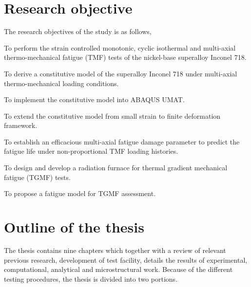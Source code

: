\section{Research objective}
\noindent
The research objectives of the study is as follows,
\begin{list}{.}
  {
  \setlength{\rightmargin}{\leftmargin}}
    \item To perform the strain controlled monotonic, cyclic isothermal and multi-axial thermo-mechanical fatigue (TMF) tests of the nickel-base superalloy Inconel 718.
    \item To derive a constitutive model of the superalloy Inconel 718 under multi-axial thermo-mechanical loading conditions.
    \item To implement the constitutive model into ABAQUS UMAT.
    \item To extend the constitutive model from small strain to finite deformation framework.
    \item To establish an efficacious multi-axial fatigue damage parameter to predict the fatigue life under non-proportional TMF loading histories.
    \item To design and develop a radiation furnace for thermal gradient mechanical fatigue (TGMF) tests.
    \item To propose a fatigue model for TGMF assessment.
\end{list}

\section{Outline of the thesis}
The thesis contains nine chapters which together with a review of relevant previous research, development of test facility, details the results of experimental, computational, analytical and microstructural work.
Because of the different testing procedures, the thesis is divided into two portions.

